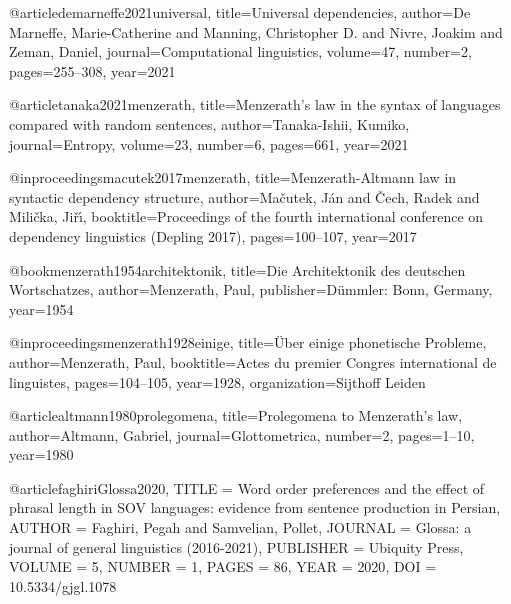 @article{demarneffe2021universal,
  title={Universal dependencies},
  author={De Marneffe, Marie-Catherine and Manning, Christopher D. and Nivre, Joakim and Zeman, Daniel},
  journal={Computational linguistics},
  volume={47},
  number={2},
  pages={255--308},
  year={2021}
}

@article{tanaka2021menzerath,
  title={Menzerath’s law in the syntax of languages compared with random sentences},
  author={Tanaka-Ishii, Kumiko},
  journal={Entropy},
  volume={23},
  number={6},
  pages={661},
  year={2021}
}

@inproceedings{macutek2017menzerath,
  title={Menzerath-Altmann law in syntactic dependency structure},
  author={Ma{\v{c}}utek, J{\'a}n and {\v{C}}ech, Radek and Mili{\v{c}}ka, Ji{\v{r}}{\'\i}},
  booktitle={Proceedings of the fourth international conference on dependency linguistics (Depling 2017)},
  pages={100--107},
  year={2017}
}


@book{menzerath1954architektonik,
  title={Die Architektonik des deutschen Wortschatzes},
  author={Menzerath, Paul},
  publisher={Dümmler: Bonn, Germany},
  year={1954}
}

@inproceedings{menzerath1928einige,
  title={{\"U}ber einige phonetische Probleme},
  author={Menzerath, Paul},
  booktitle={Actes du premier Congres international de linguistes},
  pages={104--105},
  year={1928},
  organization={Sijthoff Leiden}
}

@article{altmann1980prolegomena,
  title={Prolegomena to Menzerath’s law},
  author={Altmann, Gabriel},
  journal={Glottometrica},
  number={2},
  pages={1--10},
  year={1980}
}

@article{faghiriGlossa2020,
  TITLE = {{Word order preferences and the effect of phrasal length in SOV languages: evidence from sentence production in Persian}},
  AUTHOR = {Faghiri, Pegah and Samvelian, Pollet},
  JOURNAL = {{Glossa: a journal of general linguistics (2016-2021)}},
  PUBLISHER = {{Ubiquity Press}},
  VOLUME = {5},
  NUMBER = {1},
  PAGES = {86},
  YEAR = {2020},
  DOI = {10.5334/gjgl.1078}
}
